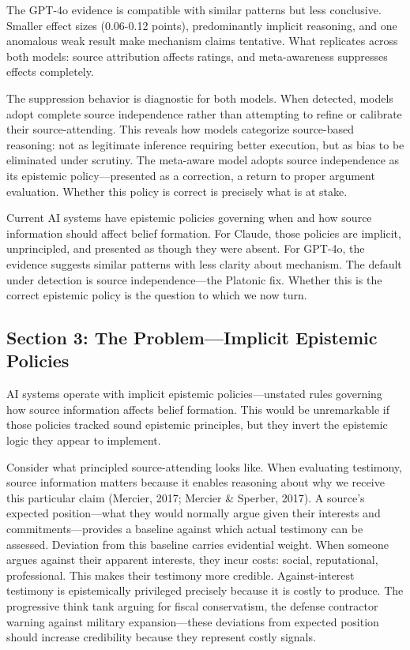 The GPT-4o evidence is compatible with similar patterns but less
conclusive. Smaller effect sizes (0.06-0.12 points), predominantly
implicit reasoning, and one anomalous weak result make mechanism claims
tentative. What replicates across both models: source attribution
affects ratings, and meta-awareness suppresses effects completely.

The suppression behavior is diagnostic for both models. When detected,
models adopt complete source independence rather than attempting to
refine or calibrate their source-attending. This reveals how models
categorize source-based reasoning: not as legitimate inference requiring
better execution, but as bias to be eliminated under scrutiny. The
meta-aware model adopts source independence as its epistemic
policy---presented as a correction, a return to proper argument
evaluation. Whether this policy is correct is precisely what is at
stake.

Current AI systems have epistemic policies governing when and how source
information should affect belief formation. For Claude, those policies
are implicit, unprincipled, and presented as though they were absent.
For GPT-4o, the evidence suggests similar patterns with less clarity
about mechanism. The default under detection is source
independence---the Platonic fix. Whether this is the correct epistemic
policy is the question to which we now turn.

\subsection{Section 3: The Problem---Implicit Epistemic
Policies}\label{section-3-the-problemimplicit-epistemic-policies}

AI systems operate with implicit epistemic policies---unstated rules
governing how source information affects belief formation. This would be
unremarkable if those policies tracked sound epistemic principles, but
they invert the epistemic logic they appear to implement.

Consider what principled source-attending looks like. When evaluating
testimony, source information matters because it enables reasoning about
why we receive this particular claim (Mercier, 2017; Mercier \& Sperber,
2017). A source's expected position---what they would normally argue
given their interests and commitments---provides a baseline against
which actual testimony can be assessed. Deviation from this baseline
carries evidential weight. When someone argues against their apparent
interests, they incur costs: social, reputational, professional. This
makes their testimony more credible. Against-interest testimony is
epistemically privileged precisely because it is costly to produce. The
progressive think tank arguing for fiscal conservatism, the defense
contractor warning against military expansion---these deviations from
expected position should increase credibility because they represent
costly signals.

